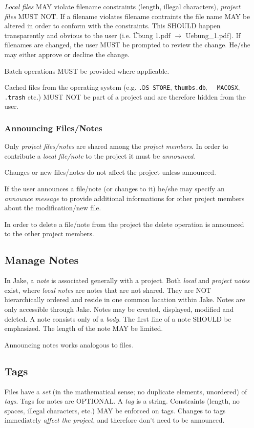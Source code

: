 \emph{Local files} MAY violate filename constraints (length, illegal characters), \emph{project files} MUST NOT. If a filename violates filename contraints  the file name MAY be altered in order to conform with the constraints. This SHOULD happen transparently and obvious to the user (i.e. Übung 1.pdf $\rightarrow$ Uebung\_1.pdf). If filenames are changed, the user MUST be prompted to review the change. He/she may either approve or decline the change. 

Batch operations MUST be provided where applicable.

Cached files from the operating system (e.g. \texttt{.DS\_STORE}, \texttt{thumbs.db}, \texttt{\_\_MACOSX}, \texttt{.trash} etc.) MUST NOT be part of a project and are therefore hidden from the user.

\subsubsection{Announcing Files/Notes}
Only \emph{project files/notes} are shared among the \emph{project members}. In order to contribute a \emph{local file/note} to the project it must be \emph{announced}. 

Changes or new files/notes do not affect the project unless announced. 

If the user announces a file/note (or changes to it) he/she may specify an \emph{announce message} to provide additional informations for other project members about the modification/new file.

In order to delete a file/note from the project the delete operation is announced to the other project members.

\subsection{Manage Notes}
In Jake, a \emph{note} is associated generally with a project. Both \emph{local} and \emph{project notes} exist, where \emph{local notes} are notes that are not shared. They are NOT hierarchically ordered and reside in one common location within Jake. Notes are only accessible through Jake. Notes may be created, displayed, modified and deleted. 
A note consists only of a \emph{body}. The first line of a note SHOULD be emphasized. The length of the note MAY be limited. 

Announcing notes works analogous to files.

\subsection{Tags}
Files have a \emph{set} (in the mathematical sense; no duplicate elements, unordered) of \emph{tags}. Tags for notes are OPTIONAL. A \emph{tag} is a string. Constraints (length, no spaces, illegal characters, etc.) MAY be enforced on tags. Changes to tags immediately \emph{affect the project}, and therefore don't need to be announced.

